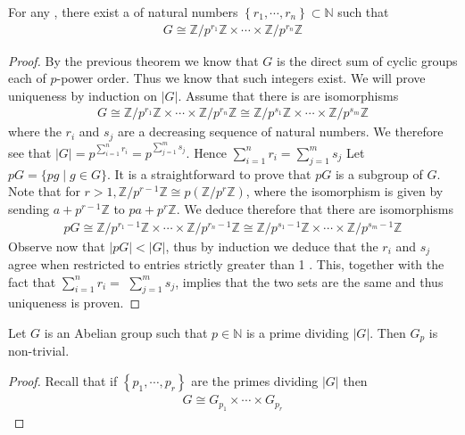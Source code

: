 \documentclass{article}
\begin{document}
\begin{cora}\label{cor:dfdfadf}
 For any , there exist a  of natural numbers $\left\{r_{1}, \cdots, r_{n}\right\} \subset \mathbb{N}$ such that
\begin{align*}
G \cong \mathbb{Z} / p^{r_{1}} \mathbb{Z} \times \cdots \times \mathbb{Z} / p^{r_{n}} \mathbb{Z}
\end{align*}
\end{cora}
\begin{proof}
 By the previous theorem we know that $G$ is the direct sum of cyclic groups each of $p$-power order. Thus we know that such integers exist. We will prove uniqueness by induction on $|G|$. Assume that there is are isomorphisms
\begin{align*}
G \cong \mathbb{Z} / p^{r_{1}} \mathbb{Z} \times \cdots \times \mathbb{Z} / p^{r_{n}} \mathbb{Z} \cong \mathbb{Z} / p^{s_{1}} \mathbb{Z} \times \cdots \times \mathbb{Z} / p^{s_{m}} \mathbb{Z}
\end{align*}
where the $r_{i}$ and $s_{j}$ are a decreasing sequence of natural numbers. We therefore see that $|G|=p^{\sum_{i=1}^{n} r_{i}}=p^{\sum_{j=1}^{m} s_{j}} .$ Hence $\sum_{i=1}^{n} r_{i}=\sum_{j=1}^{m} s_{j}$
Let $p G=\{p g \mid g \in G\} .$ It is a straightforward  to prove that $p G$ is a subgroup of $G$. Note that for $r>1, \mathbb{Z} / p^{r-1} \mathbb{Z} \cong p\left(\mathbb{Z} / p^{r} \mathbb{Z}\right)$, where the isomorphism is given by sending $a+p^{r-1} \mathbb{Z}$ to $p a+p^{r} \mathbb{Z} .$ We deduce therefore that there are isomorphisms
\begin{align*}
p G \cong \mathbb{Z} / p^{r_{1}-1} \mathbb{Z} \times \cdots \times \mathbb{Z} / p^{r_{n}-1} \mathbb{Z} \cong \mathbb{Z} / p^{s_{1}-1} \mathbb{Z} \times \cdots \times \mathbb{Z} / p^{s_{m}-1} \mathbb{Z}
\end{align*}
Observe now that $|p G|<|G|$, thus by induction we deduce that the $r_{i}$ and $s_{j}$ agree when restricted to entries strictly greater than 1 . This, together with the fact that $\sum_{i=1}^{n} r_{i}=$ $\sum_{j=1}^{m} s_{j}$, implies that the two sets are the same and thus uniqueness is proven.
\end{proof}
\begin{lema}
Let $G$ is an Abelian group such that $p \in \mathbb{N}$ is a prime dividing $|G| .$ Then $G_{p}$ is non-trivial.
\end{lema} 
\begin{proof}
Recall that if $\left\{p_{1}, \cdots, p_{r}\right\}$ are the primes dividing $|G|$ then
\begin{align*}
G \cong G_{p_{1}} \times \cdots \times G_{p_{r}}
\end{align*}
\end{proof}
\end{document}
